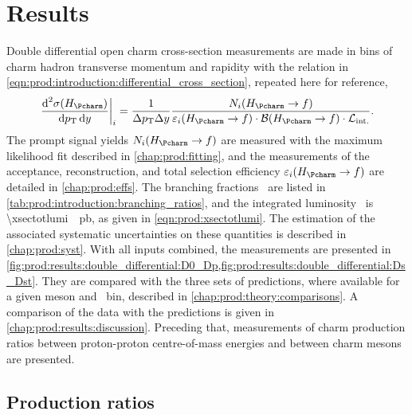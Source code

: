 \chapter{Results}
\label{chap:prod:results}

Double differential open charm cross-section measurements are made in bins of
charm hadron transverse momentum and rapidity with the relation in
\cref{eqn:prod:introduction:differential_cross_section}, repeated here for
reference,
\begin{equation*}
  \left.\frac{\dif^{2}{\xsec(\PHc)}}{\dif{\pT}\dif{\rapidity}}\right\rvert_{i}
    = \frac{1}{\Delta\pT\Delta\rapidity}
      \frac{%
        N_{i}(\HcTof)
      }{%
        \eff_{i}(\HcTof)\cdot\bfrac(\HcTof)\cdot\intlumi
      }.
\end{equation*}
The prompt signal yields $N_{i}(\HcTof)$ are measured with the maximum
likelihood fit described in \cref{chap:prod:fitting}, and the measurements of
the acceptance, reconstruction, and total selection efficiency
$\eff_{i}(\HcTof)$ are detailed in \cref{chap:prod:effs}.
The branching fractions \bfrac\ are listed in
\cref{tab:prod:introduction:branching_ratios}, and the integrated luminosity
\intlumi\ is \SI{\xsectotlumi}{\per\pico\barn}, as given in
\cref{eqn:prod:xsectotlumi}.
The estimation of the associated systematic uncertainties on these quantities
is described in \cref{chap:prod:syst}.
With all inputs combined, the measurements are presented in
\cref{fig:prod:results:double_differential:D0_Dp,fig:prod:results:double_differential:Ds_Dst}.
They are compared with the three sets of predictions, where available for a
given meson and \pTy\ bin, described in \cref{chap:prod:theory:comparisons}.
A comparison of the data with the predictions is given in
\cref{chap:prod:results:discussion}.
Preceding that, measurements of charm production ratios between proton-proton
centre-of-mass energies and between charm mesons are presented.

\section{Production ratios}
\label{chap:prod:results:ratios}

